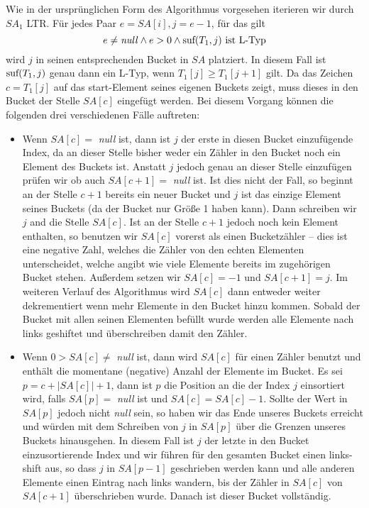 Wie in der ursprünglichen Form des Algorithmus vorgesehen iterieren wir durch $SA_1$ LTR. Für jedes Paar $e = SA[i], j = e -1$, für das gilt
\[
	e \neq \text{\textit{null}} \wedge e > 0  \wedge \text{suf}(T_1,j) \text{ ist L-Typ} 
\]
wird $j$ in seinen entsprechenden Bucket in $SA$ platziert. In diesem Fall ist $\text{suf}(T_1,j)$ genau dann ein L-Typ, wenn $T_1[j] \geq T_1[j+1]$ gilt. Da das Zeichen $c = T_1[j]$ auf das start-Element seines eigenen Buckets zeigt, muss dieses in den Bucket der Stelle $SA[c]$ eingefügt werden. Bei diesem Vorgang können die folgenden drei verschiedenen Fälle auftreten:

\begin{itemize}
\item Wenn $SA[c] = $ \textit{null} ist, dann ist $j$ der erste in diesen Bucket einzufügende Index, da an dieser Stelle bisher weder ein Zähler in den Bucket noch ein Element des Buckets ist. Anstatt $j$ jedoch genau an dieser Stelle einzufügen prüfen wir ob auch $SA[c+1]  = $ \textit{null} ist. Ist dies nicht der Fall, so beginnt an der Stelle $c+1$ bereits ein neuer Bucket und $j$ ist das einzige Element seines Buckets (da der Bucket nur Größe 1 haben kann). Dann schreiben wir $j$ and die Stelle $SA[c]$. Ist an der Stelle $c+1$ jedoch noch kein Element enthalten, so benutzen wir $SA[c]$ vorerst als einen Bucketzähler -- dies ist eine negative Zahl, welches die Zähler von den echten Elementen unterscheidet, welche angibt wie viele Elemente bereits im zugehörigen Bucket stehen. Außerdem setzen wir $SA[c] = -1$ und $SA[c+1] = j$. Im weiteren Verlauf des Algorithmus wird $SA[c]$ dann entweder weiter dekrementiert wenn mehr Elemente in den Bucket hinzu kommen. Sobald der Bucket mit allen seinen Elementen befüllt wurde werden alle Elemente nach links geshiftet und überschreiben damit den Zähler.

\item Wenn $ 0 > SA[c] \neq$ \textit{null} ist, dann wird $SA[c]$ für einen Zähler benutzt und enthält die momentane (negative) Anzahl der Elemente im Bucket. Es sei $p = c + |SA[c]| + 1$, dann ist $p$ die Position an die der Index $j$ einsortiert wird, falls $SA[p] = $ \textit{null} ist und $SA[c] = SA[c] - 1$. Sollte der Wert in $SA[p]$ jedoch nicht \textit{null} sein, so haben wir das Ende unseres Buckets erreicht und würden mit dem Schreiben von $j$ in $SA[p]$ über die Grenzen unseres Buckets hinausgehen. In diesem Fall ist $j$ der letzte in den Bucket einzusortierende Index und wir führen für den gesamten Bucket einen links-shift aus, so dass $j$ in $SA[p-1]$ geschrieben werden kann und alle anderen Elemente einen Eintrag nach links wandern, bis der Zähler in $SA[c]$ von $SA[c+1]$ überschrieben wurde. Danach ist dieser Bucket vollständig.


\end{itemize}
